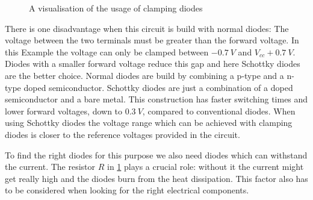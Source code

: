 \begin{figure}[htb]
	\centering
	\caption{A visualisation of the usage of clamping diodes}
	\label{fig:clamping-diodes}
\end{figure}

There is one disadvantage when this circuit is build with normal diodes: The voltage between the two terminals must be greater than the forward voltage. In this Example the voltage can only be clamped between $\SI{-0,7}{V}$ and $V_{cc} + \SI{0,7}{V}$. Diodes with a smaller forward voltage reduce this gap and here Schottky diodes are the better choice. Normal diodes are build by combining a p-type and a n-type doped semiconductor. Schottky diodes are just a combination of a doped semiconductor and a bare metal. This construction has faster switching times and lower forward voltages, down to $\SI{0,3}{V}$, compared to conventional diodes. When using Schottky diodes the voltage range which can be achieved with clamping diodes is closer to the reference voltages provided in the circuit.

To find the right diodes for this purpose we also need diodes which can withstand the current. The resistor $R$ in \cref{fig:clamping-diodes} plays a crucial role: without it the current might get really high and the diodes burn from the heat dissipation. This factor also has to be considered when looking for the right electrical components.
